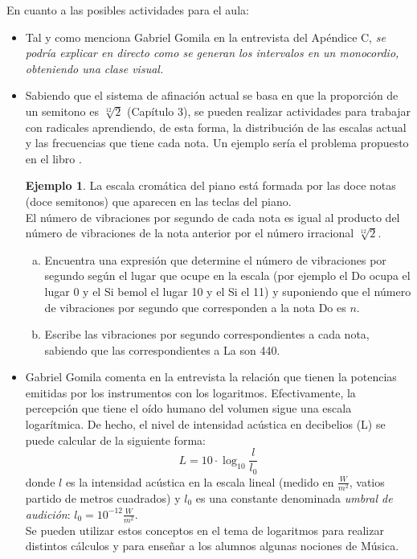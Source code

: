 \documentclass[a4paper, openright, 11pt, titlepage]{report}
\theoremstyle{definition}\newtheorem{defin}[propo]{Definition}
\theoremstyle{definition}\newtheorem{obser}[propo]{Remark}
\theoremstyle{definition}\newtheorem{ejem}[propo]{Ejemplo}
\theoremstyle{definition}\newtheorem{algoritmo}[propo]{Algoritmo}
\begin{document}
En cuanto a las posibles actividades para el aula:
\begin{itemize}
    \item Tal y como menciona Gabriel Gomila en la entrevista del Apéndice C, \textit{se podría explicar en directo como se generan los intervalos en un monocordio, obteniendo una clase visual.}
    \item Sabiendo que el sistema de afinación actual se basa en que la proporción de un semitono es $\sqrt[12]{2}$ (Capítulo 3), se pueden realizar actividades para trabajar con radicales aprendiendo, de esta forma, la distribución de las escalas actual y las frecuencias que tiene cada nota. Un ejemplo sería el problema propuesto en el libro \cite{alcaide}.\\
    \begin{ejem}
    La escala cromática del piano está formada por las doce notas (doce semitonos) que aparecen en las teclas del piano.\\
    El número de vibraciones por segundo de cada nota es igual al producto del número de vibraciones de la nota anterior por el número irracional $\sqrt[12]{2}$.
    \begin{enumerate}[(a)]
        \item Encuentra una expresión que determine el número de vibraciones por segundo según el lugar que ocupe en la escala (por ejemplo el Do ocupa el lugar 0 y el Si bemol el lugar 10 y el Si el 11) y suponiendo que el número de vibraciones por segundo que corresponden a la nota Do es $n$.
        \item Escribe las vibraciones por segundo correspondientes a cada nota, sabiendo que las correspondientes a La son 440.
    \end{enumerate}
    \end{ejem}
    \item Gabriel Gomila comenta en la entrevista la relación que tienen la potencias emitidas por los instrumentos con los logaritmos. Efectivamente, la percepción que tiene el oído humano del volumen sigue una escala logarítmica. De hecho, el nivel de intensidad acústica en decibelios (L) se puede calcular de la siguiente forma:
    $$L = 10\cdot\log_{10}\frac{l}{l_{0}}$$
    donde $l$  es la intensidad acústica en la escala lineal (medido en $\frac{W}{m^{2}}$, vatios partido de metros cuadrados) y $l_{0}$ es una constante denominada \textit{umbral de audición}: $l_{0} = 10^{-12}\frac{W}{m^{2}}$.\\
    Se pueden utilizar estos conceptos en el tema de logaritmos para realizar distintos cálculos y para enseñar a los alumnos algunas nociones de Música.
\end{itemize}
\newpage
\appendix
\end{document}
